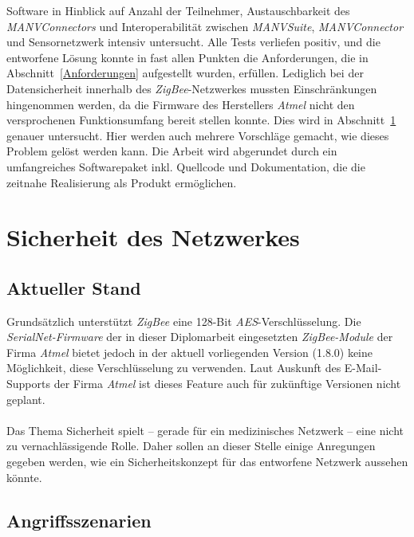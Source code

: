 Software in Hinblick auf Anzahl der Teilnehmer, Austauschbarkeit des \emph{MANVConnectors} und Interoperabilität
zwischen \emph{MANVSuite}, \emph{MANVConnector} und Sensornetzwerk intensiv untersucht. Alle Tests verliefen
positiv, und die entworfene Lösung konnte in fast allen Punkten die Anforderungen, die in Abschnitt~\ref{Anforderungen}
aufgestellt wurden, erfüllen. Lediglich bei der Datensicherheit innerhalb des \emph{ZigBee}-Netzwerkes mussten
Einschränkungen hingenommen werden, da die Firmware des Herstellers \emph{Atmel} nicht den versprochenen
Funktionsumfang bereit stellen konnte. Dies wird in Abschnitt~\ref{Sicherheit} genauer untersucht. Hier werden
auch mehrere Vorschläge gemacht, wie dieses Problem gelöst werden kann. Die Arbeit wird abgerundet durch ein
umfangreiches Softwarepaket inkl. Quellcode und Dokumentation, die die zeitnahe Realisierung als Produkt ermöglichen.

\section{Sicherheit des Netzwerkes}
\label{Sicherheit}
\subsection{Aktueller Stand}
Grundsätzlich unterstützt \emph{ZigBee} eine 128-Bit \emph{AES}-Verschlüsselung. Die \emph{SerialNet-Firmware} der in 
dieser Diplomarbeit eingesetzten \emph{ZigBee-Module} der Firma \emph{Atmel} bietet jedoch in der aktuell vorliegenden 
Version (1.8.0) keine Möglichkeit, diese Verschlüsselung zu verwenden. Laut Auskunft des E-Mail-Supports der Firma 
\emph{Atmel} ist dieses Feature auch für zukünftige Versionen nicht geplant.\\
\\
Das Thema Sicherheit spielt -- gerade für ein medizinisches Netzwerk -- eine nicht zu vernachlässigende Rolle.
Daher sollen an dieser Stelle einige Anregungen gegeben werden, wie ein Sicherheitskonzept für das entworfene Netzwerk aussehen 
könnte.

\subsection{Angriffsszenarien}

